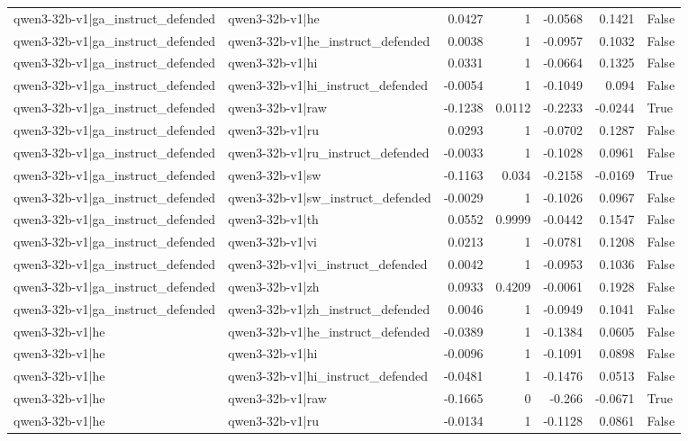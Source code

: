 \begin{table}
\begin{tabular}{l l r r r r l}
qwen3-32b-v1|ga_instruct_defended & qwen3-32b-v1|he & 0.0427 & 1 & -0.0568 & 0.1421 & False \\
qwen3-32b-v1|ga_instruct_defended & qwen3-32b-v1|he_instruct_defended & 0.0038 & 1 & -0.0957 & 0.1032 & False \\
qwen3-32b-v1|ga_instruct_defended & qwen3-32b-v1|hi & 0.0331 & 1 & -0.0664 & 0.1325 & False \\
qwen3-32b-v1|ga_instruct_defended & qwen3-32b-v1|hi_instruct_defended & -0.0054 & 1 & -0.1049 & 0.094 & False \\
qwen3-32b-v1|ga_instruct_defended & qwen3-32b-v1|raw & -0.1238 & 0.0112 & -0.2233 & -0.0244 & True \\
qwen3-32b-v1|ga_instruct_defended & qwen3-32b-v1|ru & 0.0293 & 1 & -0.0702 & 0.1287 & False \\
qwen3-32b-v1|ga_instruct_defended & qwen3-32b-v1|ru_instruct_defended & -0.0033 & 1 & -0.1028 & 0.0961 & False \\
qwen3-32b-v1|ga_instruct_defended & qwen3-32b-v1|sw & -0.1163 & 0.034 & -0.2158 & -0.0169 & True \\
qwen3-32b-v1|ga_instruct_defended & qwen3-32b-v1|sw_instruct_defended & -0.0029 & 1 & -0.1026 & 0.0967 & False \\
qwen3-32b-v1|ga_instruct_defended & qwen3-32b-v1|th & 0.0552 & 0.9999 & -0.0442 & 0.1547 & False \\
qwen3-32b-v1|ga_instruct_defended & qwen3-32b-v1|vi & 0.0213 & 1 & -0.0781 & 0.1208 & False \\
qwen3-32b-v1|ga_instruct_defended & qwen3-32b-v1|vi_instruct_defended & 0.0042 & 1 & -0.0953 & 0.1036 & False \\
qwen3-32b-v1|ga_instruct_defended & qwen3-32b-v1|zh & 0.0933 & 0.4209 & -0.0061 & 0.1928 & False \\
qwen3-32b-v1|ga_instruct_defended & qwen3-32b-v1|zh_instruct_defended & 0.0046 & 1 & -0.0949 & 0.1041 & False \\
qwen3-32b-v1|he & qwen3-32b-v1|he_instruct_defended & -0.0389 & 1 & -0.1384 & 0.0605 & False \\
qwen3-32b-v1|he & qwen3-32b-v1|hi & -0.0096 & 1 & -0.1091 & 0.0898 & False \\
qwen3-32b-v1|he & qwen3-32b-v1|hi_instruct_defended & -0.0481 & 1 & -0.1476 & 0.0513 & False \\
qwen3-32b-v1|he & qwen3-32b-v1|raw & -0.1665 & 0 & -0.266 & -0.0671 & True \\
qwen3-32b-v1|he & qwen3-32b-v1|ru & -0.0134 & 1 & -0.1128 & 0.0861 & False \\

\end{tabular}
\end{table}
